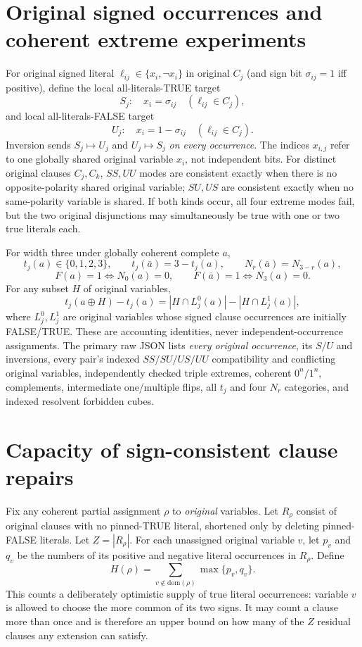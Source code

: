 \documentclass[10pt]{article}
\begin{document}
\section{Original signed occurrences and coherent extreme experiments}
For original signed literal $\ell_{ij}\in\{x_i,\neg x_i\}$ in original $C_j$ (and sign bit $\sigma_{ij}=1$ iff positive), define the local all-literals-TRUE target
\[S_j:\quad x_i=\sigma_{ij}\quad(\ell_{ij}\in C_j),\]
and local all-literals-FALSE target
\[U_j:\quad x_i=1-\sigma_{ij}\quad(\ell_{ij}\in C_j).\]
Inversion sends $S_j\mapsto U_j$ and $U_j\mapsto S_j$ \emph{on every occurrence}. The indices $x_{i,j}$ refer to one globally shared original variable $x_i$, not independent bits. For distinct original clauses $C_j,C_k$, $SS,UU$ modes are consistent exactly when there is no opposite-polarity shared original variable; $SU,US$ are consistent exactly when no same-polarity variable is shared. If both kinds occur, all four extreme modes fail, but the two original disjunctions may simultaneously be true with one or two true literals each.

For width three under globally coherent complete $a$,
\[
t_j(a)\in\{0,1,2,3\},\qquad t_j(\overline a)=3-t_j(a),\qquad
N_r(\overline a)=N_{3-r}(a),\]
\[
F(a)=1\iff N_0(a)=0,\qquad
F(\overline a)=1\iff N_3(a)=0.
\]
For any subset $H$ of original variables,
\[
t_j(a\oplus H)-t_j(a)=|H\cap L^0_j(a)|-|H\cap L^1_j(a)|,\]
where $L^0_j,L^1_j$ are original variables whose signed clause occurrences are initially FALSE/TRUE. These are accounting identities, never independent-occurrence assignments. The primary raw JSON lists \emph{every original occurrence}, its $S/U$ and inversions, every pair's indexed $SS/SU/US/UU$ compatibility and conflicting original variables, independently checked triple extremes, coherent $0^n/1^n$, complements, intermediate one/multiple flips, all $t_j$ and four $N_r$ categories, and indexed resolvent forbidden cubes.

\section{Capacity of sign-consistent clause repairs}
Fix any coherent partial assignment $\rho$ to \emph{original} variables. Let $R_\rho$ consist of original clauses with no pinned-TRUE literal, shortened only by deleting pinned-FALSE literals. Let $Z=|R_\rho|$. For each unassigned original variable $v$, let $p_v$ and $q_v$ be the numbers of its positive and negative literal occurrences in $R_\rho$. Define
\[
H(\rho)=\sum_{v\notin\mathrm{dom}(\rho)}\max\{p_v,q_v\}.
\]
This counts a deliberately optimistic supply of true literal occurrences: variable $v$ is allowed to choose the more common of its two signs. It may count a clause more than once and is therefore an upper bound on how many of the $Z$ residual clauses any extension can satisfy.
\end{document}
